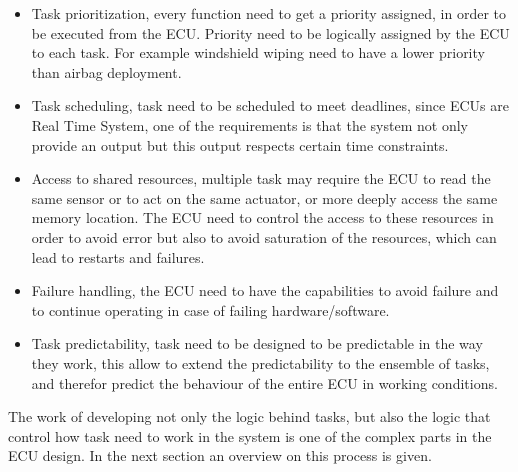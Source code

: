 \documentclass[../main.tex]{subfiles}
\begin{document}
\begin{itemize}
    \item Task prioritization, every function need to get a priority assigned, in order to be executed from the ECU. Priority need to be logically assigned by the ECU to each task. For example windshield wiping need to have a lower priority than airbag deployment. 
    \item Task scheduling, task need to be scheduled to meet deadlines, since ECUs are Real Time System, one of the requirements is that the system not only provide an output but this output respects certain time constraints.
    \item Access to shared resources, multiple task may require the ECU to read the same sensor or to act on the same actuator, or more deeply access the same memory location. The ECU need to control the access to these resources in order to avoid error but also to avoid saturation of the resources, which can lead to restarts and failures.  
    \item Failure handling, the ECU need to have the capabilities to avoid failure and to continue operating in case of failing hardware/software.
    \item Task predictability, task need to be designed to be predictable in the way they work, this allow to extend the predictability to the ensemble of tasks, and therefor predict the behaviour of the entire ECU in working conditions. 
\end{itemize}
The work of developing not only the logic behind tasks, but also the logic that control how task need to work in the system is one of the complex parts in the ECU design. In the next section an overview on this process is given. 
\end{document}
